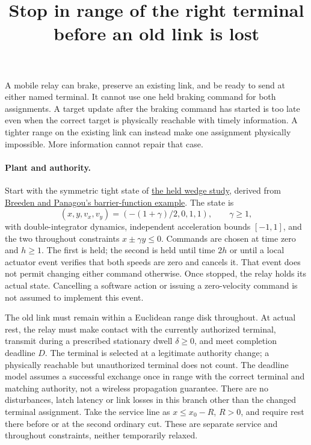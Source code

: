 \documentclass{article}
\title{Stop in range of the right terminal before an old link is lost}
\begin{document}
\maketitle

A mobile relay can brake, preserve an existing link, and be ready to send at either named terminal. It cannot use one held braking command for both assignments. A target update after the braking command has started is too late even when the correct target is physically reachable with timely information. A tighter range on the existing link can instead make one assignment physically impossible. More information cannot repair that case.

\paragraph{Plant and authority.}
Start with the symmetric tight state of \href{https://github.com/eternal-november/eos-research-programmes/pull/443}{the held wedge study}, derived from \href{https://arxiv.org/abs/2210.01354}{Breeden and Panagou's barrier-function example}. The state is
\[
 (x,y,v_x,v_y)=(-(1+\gamma)/2,0,1,1),
 \qquad \gamma\ge1,
\]
with double-integrator dynamics, independent acceleration bounds \([-1,1]\), and the two throughout constraints \(x\pm\gamma y\le0\). Commands are chosen at time zero and \(h\ge1\). The first is held; the second is held until time \(2h\) or until a local actuator event verifies that both speeds are zero and cancels it. That event does not permit changing either command otherwise. Once stopped, the relay holds its actual state. Cancelling a software action or issuing a zero-velocity command is not assumed to implement this event.

The old link must remain within a Euclidean range disk throughout. At actual rest, the relay must make contact with the currently authorized terminal, transmit during a prescribed stationary dwell \(\delta\ge0\), and meet completion deadline \(D\). The terminal is selected at a legitimate authority change; a physically reachable but unauthorized terminal does not count. The deadline model assumes a successful exchange once in range with the correct terminal and matching authority, not a wireless propagation guarantee. There are no disturbances, latch latency or link losses in this branch other than the changed terminal assignment. Take the service line as \(x\le x_0-R\), \(R>0\), and require rest there before or at the second ordinary cut. These are separate service and throughout constraints, neither temporarily relaxed.
\end{document}
